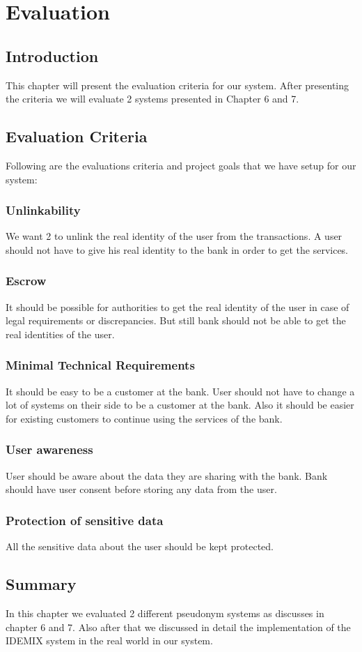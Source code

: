 \chapter{Evaluation}
\section{Introduction}
This chapter will present the evaluation criteria for our system. After presenting the criteria we will evaluate 2 systems presented in Chapter 6 and 7.
\section{Evaluation Criteria}
Following are the evaluations criteria and project goals that we have setup for our system:
\subsection{Unlinkability}
We want 2 to unlink the real identity of the user from the transactions. A user should not have to give his real identity to the bank in order to get the services. 
\subsection{Escrow}
It should be possible for authorities to get the real identity of the user in case of legal requirements or discrepancies. But still bank should not be able to get the real identities of the user.
\subsection{Minimal Technical Requirements}
It should be easy to be a customer at the bank. User should not have to change a lot of systems on their side to be a customer at the bank. Also it should be easier for existing customers to continue using the services of the bank.
\subsection{User awareness}
User should be aware about the data they are sharing with the bank. Bank should have user consent before storing any data from the user.
\subsection{Protection of sensitive data}
All the sensitive data about the user should be kept protected.
\section{Summary}
In this chapter we evaluated 2 different pseudonym systems as discusses in chapter 6 and 7. Also after that we discussed in detail the implementation of the IDEMIX system in the real world in our system.
